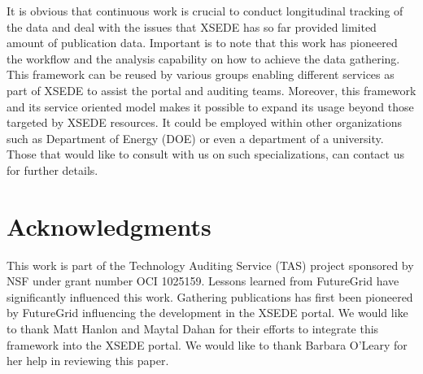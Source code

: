 \documentclass{sig-alternate}
\begin{document}
It is obvious that continuous work is crucial to conduct longitudinal tracking of the data and deal with the issues that XSEDE has so far provided limited amount of publication data. Important is to note that this work has pioneered the workflow and the analysis capability on how to achieve the data gathering. This framework can be reused by various groups enabling different services as part of XSEDE to assist the portal and auditing teams. Moreover, this framework and its service oriented model makes it possible to expand its usage beyond those targeted by XSEDE resources. It could be employed within other organizations such as Department of Energy (DOE) or even a department of a university. Those that would like to consult with us on such specializations, can contact us for further details.


\section{Acknowledgments}

 
This work is part of the Technology Auditing Service (TAS) project sponsored by NSF under grant number OCI 1025159. Lessons learned from FutureGrid have significantly influenced this work. Gathering publications has first been pioneered by FutureGrid influencing the development in the XSEDE portal. We would like to thank Matt Hanlon and Maytal Dahan for their efforts to integrate this framework into the XSEDE portal. We would like to thank Barbara O'Leary for her help in reviewing this paper.
 
%
%
 
 

\end{document}
